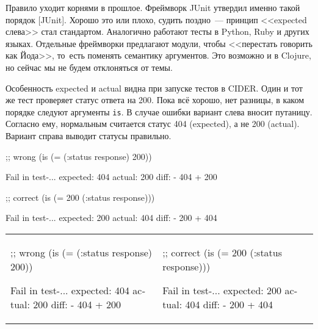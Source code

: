 \fi


Правило уходит корнями в прошлое. Фреймворк JUnit утвердил именно такой порядок
[JUnit].
Хорошо это или плохо, судить поздно~--- принцип <<expected слева>> стал
стандартом. Аналогично работают тесты в Python, Ruby и других языках. Отдельные
фреймворки предлагают модули, чтобы <<перестать говорить как Йода>>, то~есть
поменять семантику аргументов. Это возможно и в Clojure, но сейчас мы не будем
отклоняться от темы.


Особенность expected и actual видна при запуске тестов в CIDER. Один и тот же
тест проверяет статус ответа на 200. Пока всё хорошо, нет разницы, в каком
порядке следуют аргументы \verb|is|. В случае ошибки вариант слева вносит
путаницу. Согласно ему, нормальным считается статус 404 (expected), а не 200
(actual). Вариант справа выводит статусы правильно.

\ifnarrow

\begin{english}
  \begin{clojure}
;; wrong
(is (= (:status response)
       200))

Fail in test-...
expected: 404
  actual: 200
    diff: - 404
          + 200
  \end{clojure}

\splitter

  \begin{clojure}
;; correct
(is (= 200
       (:status response)))

Fail in test-...
expected: 200
  actual: 404
    diff: - 200
          + 404
  \end{clojure}
\end{english}

\else

\begin{english}

\noindent
\begin{tabular}{ @{}p{5.5cm} @{}p{4.5cm} }

  \begin{clojure}
;; wrong
(is (= (:status response)
       200))

Fail in test-...
expected: 404
  actual: 200
    diff: - 404
          + 200
  \end{clojure}

&

  \begin{clojure}
;; correct
(is (= 200
       (:status response)))

Fail in test-...
expected: 200
  actual: 404
    diff: - 200
          + 404
  \end{clojure}

\end{tabular}

\end{english}

